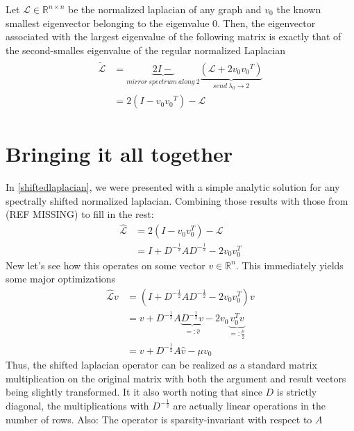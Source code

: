 \documentclass[10pt, a4paper, twocolumn]{article} %
\begin{document}
    \newtheorem{combined}[]{Corollary: Making the $v_2$ accessible }[section]
    \begin{shifting}
        Let $\mathcal{L} \in \mathbb{R}^{n \times n}$ be the normalized laplacian of any graph and $v_0$ the known
        smallest eigenvector belonging to the eigenvalue $0$. Then, the eigenvector associated with the largest
        eigenvalue of the following matrix is exactly that of the second-smalles eigenvalue of the regular
        normalized Laplacian
        \begin{align}
            \begin{split}
                \tilde{\mathcal{L}} & = \underbrace{2I -}_{mirror\ spectrum\ along\ 2} \underbrace{\left( \mathcal{L} + 2 v_0 {v_0}^T \right)}_{send\ \lambda_0 \rightarrow 2} \\
                & = 2 \left( I - v_0 {v_0}^T \right) - \mathcal{L}
            \end{split}
        \end{align}
    \end{shifting}

    \section{Bringing it all together}
    In \eqref{shiftedlaplacian}, we were presented with a simple analytic solution for any spectrally shifted normalized laplacian.
    Combining those results with those from (REF MISSING) to fill in the rest:
    \begin{equation}
        \begin{split}
            \hat{\mathcal{L}} & = 2 ( I - v_0 v_0^T ) - \mathcal{L}\\
            & = I + D^{-\frac{1}{2}} A D^{-\frac{1}{2}} - 2 v_0 v_0^T
        \end{split}
    \end{equation}
    New let's see how this operates on some vector $v \in \mathbb{R}^n$. This immediately yields some major optimizations
    \begin{equation}
        \begin{split}
            \hat{\mathcal{L}}v & = \left( I + D^{-\frac{1}{2}} A D^{-\frac{1}{2}} - 2 v_0 v_0^T\right) v\\
            & = v + D^{-\frac{1}{2}} A \underbrace{D^{-\frac{1}{2}} v}_{=:\hat{v}} - 2 v_0 \underbrace{v_0^T v}_{=:\frac{\mu}{2}}\\
            & = v + D^{-\frac{1}{2}} A \hat{v} - \mu v_0
        \end{split}
    \end{equation}
    Thus, the shifted laplacian operator can be realized as a standard matrix multiplication on the original matrix with both the
    argument and result vectors being slightly transformed. It it also worth noting that since $D$ is strictly diagonal, the multiplications with $D^{-\frac{1}{2}}$
    are actually linear operations in the number of rows. Also: The operator is sparsity-invariant with respect to $A$
\end{document}
